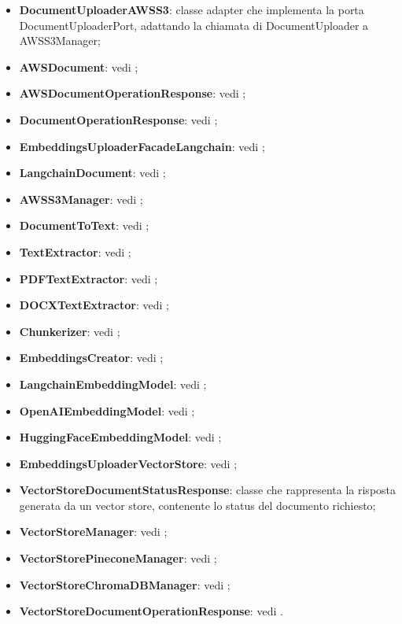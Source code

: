 \documentclass[10pt, a4paper]{article}
\begin{document}
\begin{itemize}
    \item \label{DocumentUploaderAWSS3}\textbf{DocumentUploaderAWSS3}: classe adapter che implementa la porta DocumentUploaderPort, adattando la chiamata di DocumentUploader a AWSS3Manager;
    \item \textbf{AWSDocument}: vedi ;
    \item \textbf{AWSDocumentOperationResponse}: vedi ;
    \item \textbf{DocumentOperationResponse}: vedi ;
    \item \textbf{EmbeddingsUploaderFacadeLangchain}: vedi ;
    \item \textbf{LangchainDocument}: vedi ;
    \item \textbf{AWSS3Manager}: vedi ;
    \item \textbf{DocumentToText}: vedi ;
    \item \textbf{TextExtractor}: vedi ;
    \item \textbf{PDFTextExtractor}: vedi ;
    \item \textbf{DOCXTextExtractor}: vedi ;
    \item \textbf{Chunkerizer}: vedi ;
    \item \textbf{EmbeddingsCreator}: vedi ;
    \item \textbf{LangchainEmbeddingModel}: vedi ;
    \item \textbf{OpenAIEmbeddingModel}: vedi ;
    \item \textbf{HuggingFaceEmbeddingModel}: vedi ;
    \item \textbf{EmbeddingsUploaderVectorStore}: vedi ;
    \item \label{VectorStoreDocumentStatusResponse}\textbf{VectorStoreDocumentStatusResponse}: classe che rappresenta la risposta generata da un vector store, contenente lo status del documento richiesto;
    \item \textbf{VectorStoreManager}: vedi ;
    \item \textbf{VectorStorePineconeManager}: vedi ;
    \item \textbf{VectorStoreChromaDBManager}: vedi ;
    \item \textbf{VectorStoreDocumentOperationResponse}: vedi .
\end{itemize}
\end{document}
